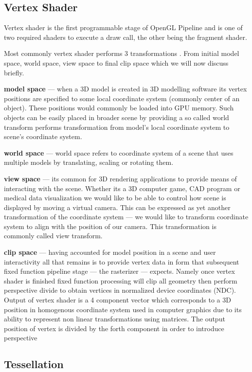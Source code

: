 \subsection{Vertex Shader}

Vertex shader is the first programmable stage of OpenGL Pipeline and is one of two required shaders to execute a draw call, the other being the fragment shader.

Most commonly vertex shader performs 3 transformations \cite{glsuperbible}. From initial model space, world space, view space to final clip space which we will now discuss briefly.

\textbf{model space} --- when a 3D model is created in 3D modelling software its vertex positions are specified to some local coordinate system (commonly center of an object).
These positions would commonly be loaded into GPU memory. Such objects can be easily placed in broader scene by providing a so called world transform performs transformation from model's local coordinate system
to scene's coordinate system.

\textbf{world space} --- world space refers to coordinate system of a scene that uses multiple models by translating, scaling or rotating them.

\textbf{view space} --- its common for 3D rendering applications to provide means of interacting with the scene. Whether its a 3D computer game, CAD program or medical data visualization we would like to be able to 
control how scene is displayed by moving a virtual camera. This can be expressed as yet another transformation of the coordinate system --- we would like to transform coordinate system to align with the position of our camera.
This transformation is commonly called view transform.

\textbf{clip space} --- having accounted for model position in a scene and user interactivity all that remains is to provide vertex data in form that subsequent fixed function pipeline stage --- the rasterizer --- expects.
Namely once vertex shader is finished fixed function processing will clip all geometry then perform perspective divide to obtain vertices in normalized device coordinates (NDC).
Output of vertex shader is a 4 component vector which corresponds to a 3D position in homogenous coordinate system used in computer graphics due to its ability to represent non linear transformations using matrices.
The output position of vertex is divided by the forth component in order to introduce perspective 

\subsection{Tessellation}

